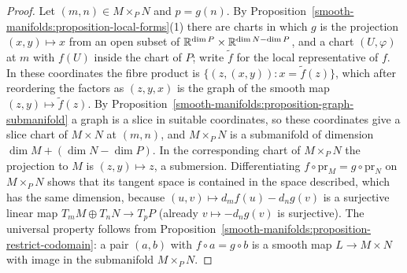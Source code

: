 \begin{proof}
Let $(m, n) \in M \times_PN$ and $p = g(n)$. By Proposition~\ref{smooth-manifolds:proposition-local-forms}(1) there are charts in which $g$ is the projection
$(x, y) \mapsto x$ from an open subset of $\mathbb{R}^{\dim P} \times \mathbb{R}^{\dim N - \dim P}$, and a chart $(U, \varphi)$ at $m$ with $f(U)$ inside the chart of $P$; write
$\tilde{f}$ for the local representative of $f$. In these coordinates the fibre product is
$\{(z, (x, y)) : x = \tilde{f}(z)\}$, which after reordering the factors as $(z, y, x)$ is the graph of the smooth map $(z, y) \mapsto \tilde{f}(z)$. By
Proposition~\ref{smooth-manifolds:proposition-graph-submanifold} a graph is a slice in suitable coordinates, so these coordinates give a slice chart of
$M \times N$ at $(m, n)$, and $M \times_PN$ is a submanifold of dimension $\dim M + (\dim N - \dim P)$. In the corresponding chart of $M \times_PN$ the projection
to $M$ is $(z, y) \mapsto z$, a submersion. Differentiating $f \circ \mathrm{pr}_M = g \circ \mathrm{pr}_N$ on $M \times_PN$ shows that its tangent space is
contained in the space described, which has the same dimension, because $(u, v) \mapsto d_mf(u) - d_ng(v)$ is a surjective linear map $T_mM \oplus T_nN \to T_pP$
(already $v \mapsto -d_ng(v)$ is surjective). The universal property follows from
Proposition~\ref{smooth-manifolds:proposition-restrict-codomain}: a pair $(a, b)$ with $f \circ a = g \circ b$ is a smooth map $L \to M \times N$ with image in the
submanifold $M \times_PN$.
\end{proof}

